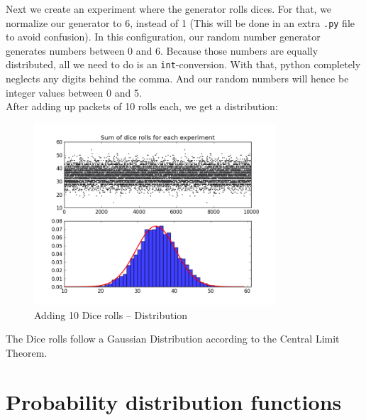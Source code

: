 \documentclass{article}
\begin{document}
Next we create an experiment where the generator rolls dices. For that, we
normalize our generator to 6, instead of 1 (This will be done in an extra
\texttt{.py} file to avoid confusion). In this configuration, our random number
generator generates numbers between 0 and 6. Because those numbers are equally
distributed, all we need to do is an \texttt{int}-conversion. With that,
python completely neglects any digits behind the comma. And our random numbers
will hence be integer values between 0 and 5. \\
After adding up packets of 10 rolls each, we get a distribution:
\begin{figure}[H]
    \centering
    \includegraphics[width=9cm]{Fig1-5.png}
    \caption{Adding 10 Dice rolls -- Distribution}
\end{figure}
The Dice rolls follow a Gaussian Distribution according to the Central Limit
Theorem.

\section{Probability distribution functions}
\end{document}
